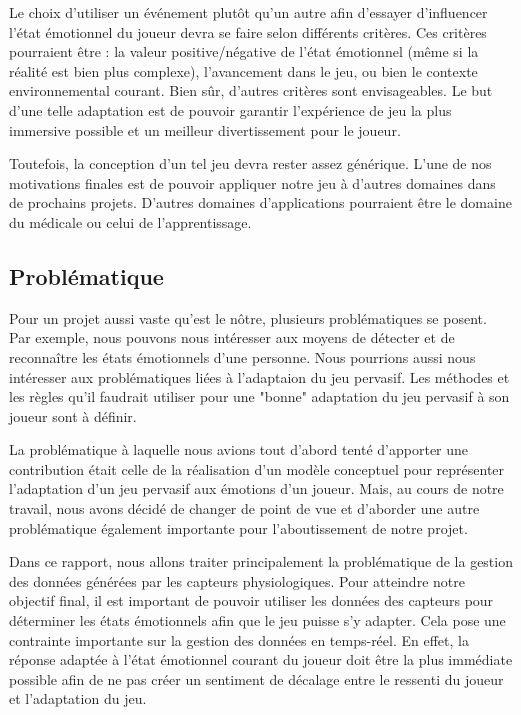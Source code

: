 \documentclass{article}
\begin{document}
		Le choix d'utiliser un événement plutôt qu'un autre afin d'essayer d'influencer l'état émotionnel du joueur devra se faire selon différents critères.
		Ces critères pourraient être : la valeur positive/négative de l'état émotionnel (même si la réalité est bien plus complexe), l'avancement dans le jeu, ou bien le contexte environnemental courant.
		Bien sûr, d'autres critères sont envisageables.
		Le but d'une telle adaptation est de pouvoir garantir l'expérience de jeu la plus immersive possible et un meilleur divertissement pour le joueur.\par
		Toutefois, la conception d'un tel jeu devra rester assez générique.
		L'une de nos motivations finales est de pouvoir appliquer notre jeu à d'autres domaines dans de prochains projets.
		D'autres domaines d'applications pourraient être le domaine du médicale ou celui de l'apprentissage.
	\subsection{Problématique}\label{sec:problematique}
		Pour un projet aussi vaste qu'est le nôtre, plusieurs problématiques se posent.
		Par exemple, nous pouvons nous intéresser aux moyens de détecter et de reconnaître les états émotionnels d'une personne.
		Nous pourrions aussi nous intéresser aux problématiques liées à l'adaptaion du jeu pervasif.
		Les méthodes et les règles qu'il faudrait utiliser pour une "bonne" adaptation du jeu pervasif à son joueur sont à définir.\par
		La problématique à laquelle nous avions tout d'abord tenté d'apporter une contribution était celle de la réalisation d'un modèle conceptuel pour représenter l'adaptation d'un jeu pervasif aux émotions d'un joueur.
		Mais, au cours de notre travail, nous avons décidé de changer de point de vue et  d'aborder une autre problématique également importante pour l'aboutissement de notre projet.\par
		Dans ce rapport, nous allons traiter principalement la problématique de la gestion des données générées par les capteurs physiologiques.
		Pour atteindre notre objectif final, il est important de pouvoir utiliser les données des capteurs pour déterminer les états émotionnels afin que le jeu puisse s'y adapter. 
		Cela pose une contrainte importante sur la gestion des données en temps-réel.
		En effet, la réponse adaptée à l'état émotionnel courant du joueur doit être la plus immédiate possible afin de ne pas créer un sentiment de décalage entre le ressenti du joueur et l'adaptation du jeu.
\end{document}
